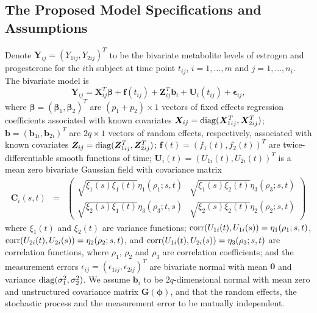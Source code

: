\documentclass[review]{elsarticle}
\begin{document}
\subsection{The Proposed Model Specifications and Assumptions}
Denote $\bm Y_{ij} = (Y_{1ij}, Y_{2ij})^T$ to be the bivariate metabolite levels of estrogen and progesterone for the $i$th subject at time point $t_{ij}$, 
$i = 1, \dots, m$ and $j = 1, \dots, n_i$. 
The bivariate model is
\begin{equation} \label{biv}
\boldsymbol Y_{ij} 
=
\boldsymbol X_{ij}^T\boldsymbol{\beta} +
\boldsymbol f(t_{ij}) + \boldsymbol Z_{ij}^T
\boldsymbol b_{i} + 
\boldsymbol U_{i}(t_{ij}) + 
\boldsymbol \epsilon_{ij},
\end{equation}
where 
$\bm \beta = (\bm \beta_1, \bm \beta_2)^T$ are $(p_1 +p_2) \times 1$ vectors of fixed effects regression coefficients associated with known covariates $\bm X_{ij}={\rm diag}(\bm X_{1ij}^T, \bm X_{2ij}^T)$; 
$\bm b = (\bm b_{1i}, \bm b_{2i})^T$ are $2q \times 1$ vectors of random effects, respectively, associated with known covariates $\bm Z_{ij}={\rm diag}(\bm Z_{1ij}^T, \bm Z_{2ij}^T)$; 
$\bm f(t) = (f_1(t), f_2(t))^T$ are  twice-differentiable  smooth functions of time; 
$\bm U_i(t) = (U_{1i}(t), U_{2i}(t))^T$ is a mean zero bivariate Gaussian field  with 
covariance matrix 
\begin{eqnarray} \label{gfcov}
\boldsymbol C_i(s, t) &=&
  \begin{pmatrix}
 \sqrt {\xi_1(s) \xi_1(t)} \eta_1(\rho_1; s, t) &   \sqrt {\xi_1(s) \xi_2(t)} \eta_3(\rho_3; s, t)
  \\
 \sqrt {\xi_2(s) \xi_1(t)} \eta_3(\rho_3; t, s)
 &   \sqrt {\xi_2(s) \xi_2(t)} \eta_2(\rho_2; s, t)
 \end{pmatrix}
\end{eqnarray}
where 
$\xi_1(t)$ and $\xi_2(t)$ are  variance functions;  
${\rm corr} (U_{1i}(t), U_{1i}(s)) = \eta_1(\rho_1; s, t)$,  \\
${\rm corr} (U_{2i}(t), U_{2i}(s)) = \eta_2(\rho_2; s, t)$, 
and ${\rm corr} (U_{1i}(t), U_{2i}(s)) = \eta_3(\rho_3; s, t)$
 are correlation functions, where 
$\rho_1$,  $\rho_2$ and $\rho_3$ 
are correlation coefficients; 
and 
the measurement errors $\epsilon_{ij} = (\epsilon_{1ij}, \epsilon_{2ij})^T$ are bivariate  normal with mean $\bm 0$ and variance ${\rm diag}(\sigma_1^2, \sigma_2^2)$.
We assume  $\bm b_i$ to be  $2q$-dimensional normal  with mean zero and unstructured covariance matrix $\bm G(\bm \phi)$,   
and that the random effects, the stochastic process and the measurement error to be mutually independent. 
\end{document}
